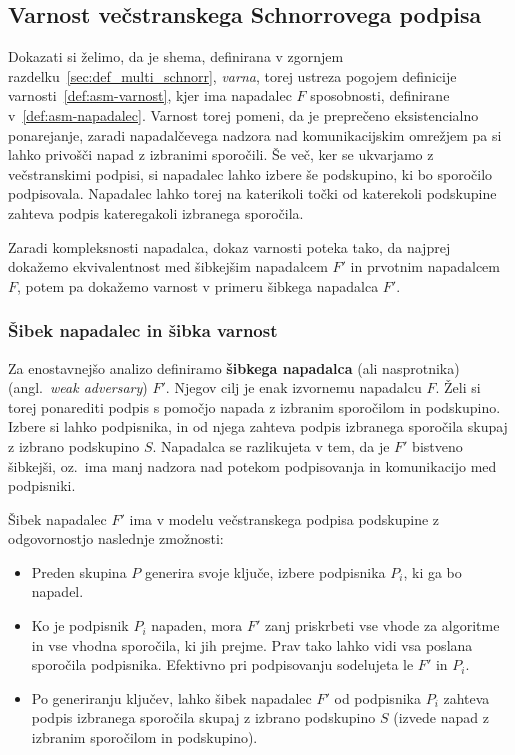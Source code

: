 \documentclass[isrm2, tisk]{fmfdelo}
\begin{document}
\subsection{Varnost večstranskega Schnorrovega podpisa}
\label{sec:proof_multi_schnorr}
Dokazati si želimo, da je shema, definirana v zgornjem razdelku~\ref{sec:def_multi_schnorr}, \textit{varna},
torej ustreza pogojem definicije varnosti~\ref{def:asm-varnost}, kjer ima napadalec $F$ sposobnosti,
definirane v~\ref{def:asm-napadalec}. Varnost torej pomeni, da je preprečeno eksistencialno ponarejanje,
zaradi napadalčevega nadzora nad komunikacijskim omrežjem pa si lahko privošči napad z izbranimi sporočili.
Še več, ker se ukvarjamo z večstranskimi podpisi, si napadalec lahko izbere še podskupino, ki bo 
sporočilo podpisovala. Napadalec lahko torej na katerikoli točki od katerekoli podskupine zahteva
podpis kateregakoli izbranega sporočila.

Zaradi kompleksnosti napadalca, dokaz varnosti poteka tako, da najprej dokažemo ekvivalentnost med
šibkejšim napadalcem $F'$ in prvotnim napadalcem $F$, potem pa dokažemo varnost v primeru šibkega
napadalca $F'$.

\subsubsection{Šibek napadalec in šibka varnost}
Za enostavnejšo analizo definiramo \textbf{šibkega napadalca} (ali nasprotnika) (angl.\
\textit{weak adversary}) $F'$. Njegov cilj je enak izvornemu napadalcu $F$. Želi si torej ponarediti podpis
s pomočjo napada z izbranim sporočilom in podskupino. Izbere si lahko podpisnika, in od njega
zahteva podpis izbranega sporočila skupaj z izbrano podskupino $S$. Napadalca se razlikujeta v tem,
da je $F'$ bistveno šibkejši, oz.\ ima manj nadzora nad potekom podpisovanja in komunikacijo med
podpisniki.

\begin{definicija}
\label{def:asm-sibek-napadalec}
    Šibek napadalec $F'$ ima v modelu večstranskega podpisa podskupine z odgovornostjo naslednje
    zmožnosti:
    \begin{itemize}
        \item Preden skupina $P$ generira svoje ključe, izbere podpisnika $P_i$, ki ga bo napadel.
        \item Ko je podpisnik $P_i$ napaden, mora $F'$ zanj priskrbeti vse vhode za algoritme in
            vse vhodna sporočila, ki jih prejme. Prav tako lahko vidi vsa poslana sporočila
            podpisnika. Efektivno pri podpisovanju sodelujeta le $F'$ in $P_i$.
        \item Po generiranju ključev, lahko šibek napadalec $F'$ od podpisnika $P_i$ zahteva podpis
            izbranega sporočila skupaj z izbrano podskupino $S$ (izvede napad z izbranim sporočilom in
            podskupino).
    \end{itemize}
\end{definicija}
\end{document}
